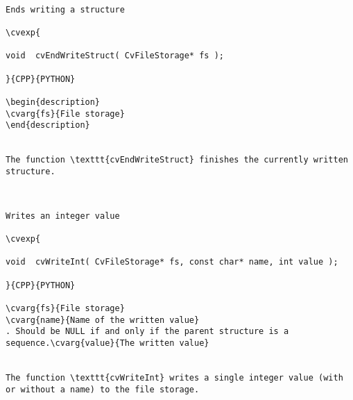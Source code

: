 \begin{verbatim}

Ends writing a structure

\cvexp{

void  cvEndWriteStruct( CvFileStorage* fs );

}{CPP}{PYTHON}

\begin{description}
\cvarg{fs}{File storage}
\end{description}


The function \texttt{cvEndWriteStruct} finishes the currently written structure.


\end{verbatim}
\begin{verbatim}

Writes an integer value

\cvexp{

void  cvWriteInt( CvFileStorage* fs, const char* name, int value );

}{CPP}{PYTHON}

\cvarg{fs}{File storage}
\cvarg{name}{Name of the written value}
. Should be NULL if and only if the parent structure is a sequence.\cvarg{value}{The written value}


The function \texttt{cvWriteInt} writes a single integer value (with or without a name) to the file storage.


\end{verbatim}

